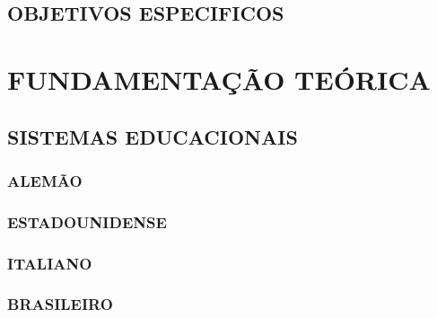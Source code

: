 \documentclass[12pt,a4paper]{article}
\begin{document}
		\subsection{OBJETIVOS ESPECIFICOS}

			\lipsum[1]

	\newpage


	\section{FUNDAMENTAÇÃO TEÓRICA}
		\lipsum[1]


		\subsection{SISTEMAS EDUCACIONAIS}

			\lipsum[1]

			\subsubsection{ALEMÃO}

				\lipsum[1]

			\subsubsection{ESTADOUNIDENSE}

				\lipsum[1]

			\subsubsection{ITALIANO}

				\lipsum[1]

			\subsubsection{BRASILEIRO}
\end{document}
